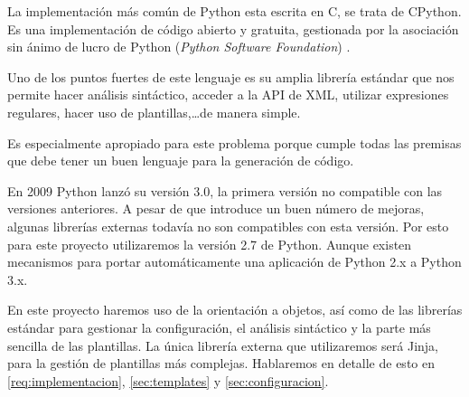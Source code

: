 La implementación más común de Python esta escrita en C, se trata de CPython. Es una implementación de código abierto y gratuita, gestionada por la asociación sin ánimo de lucro  de Python (\emph{Python Software Foundation}) \cite{python}.\medskip\par
Uno de los puntos fuertes de este lenguaje es su amplia librería estándar que nos permite hacer análisis sintáctico, acceder a la API de XML, utilizar expresiones regulares, hacer uso de plantillas,\ldots de manera simple.\par
Es especialmente apropiado para este problema porque cumple todas las premisas que debe tener un buen lenguaje para la generación de código.\par
En 2009 Python lanzó su versión 3.0, la primera versión no compatible con las versiones anteriores. A pesar de que introduce un buen número de mejoras, algunas librerías externas todavía no son compatibles con esta versión. Por esto para este proyecto utilizaremos la versión 2.7 de Python. Aunque existen mecanismos \cite{py:2to3} para portar automáticamente una aplicación de Python 2.x a Python 3.x.\par
En este proyecto haremos uso de la orientación a objetos, así como de las librerías estándar para gestionar la configuración, el análisis sintáctico y la parte más sencilla de las plantillas. La única librería externa que utilizaremos será Jinja, para la gestión de plantillas más complejas. Hablaremos en detalle de esto en \ref{req:implementacion}, \ref{sec:templates} y \ref{sec:configuracion}.

